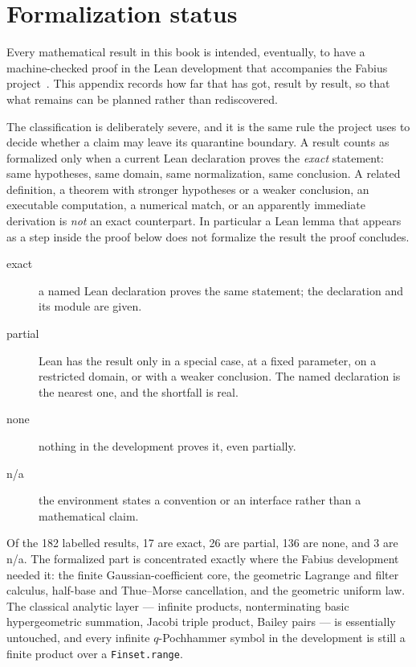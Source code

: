 \documentclass[11pt,oneside,openany]{book}
\theoremstyle{definition}
\theoremstyle{remark}
\newcommand{\statusexact}{\textsf{\color{statusgreen}exact}}
\newcommand{\statuspartial}{\textsf{\color{statusamber}partial}}
\newcommand{\statusnone}{\textsf{\color{statusred}none}}
\newcommand{\statusna}{\textsf{n/a}}
\begin{document}
\chapter{Formalization status}\label{app:lean-status}

Every mathematical result in this book is intended, eventually, to have a
machine-checked proof in the Lean development that accompanies the Fabius
project~\cite{ReshetnikovProveIt2026}.  This appendix records how far that
has got, result by result, so that what remains can be planned rather than
rediscovered.

The classification is deliberately severe, and it is the same rule the
project uses to decide whether a claim may leave its quarantine boundary.
A result counts as formalized only when a current Lean declaration proves
the \emph{exact} statement: same hypotheses, same domain, same
normalization, same conclusion.  A related definition, a theorem with
stronger hypotheses or a weaker conclusion, an executable computation, a
numerical match, or an apparently immediate derivation is \emph{not} an
exact counterpart.  In particular a Lean lemma that appears as a step
inside the proof below does not formalize the result the proof concludes.

\begin{description}
\item[\statusexact] a named Lean declaration proves the same statement; the
  declaration and its module are given.
\item[\statuspartial] Lean has the result only in a special case, at a fixed
  parameter, on a restricted domain, or with a weaker conclusion.  The named
  declaration is the nearest one, and the shortfall is real.
\item[\statusnone] nothing in the development proves it, even partially.
\item[\statusna] the environment states a convention or an interface rather
  than a mathematical claim.
\end{description}

Of the 182 labelled results, 17 are \statusexact, 26 are \statuspartial,
136 are \statusnone, and 3 are \statusna.
The formalized part is concentrated exactly where the Fabius development
needed it: the finite Gaussian-coefficient core, the geometric Lagrange and
filter calculus, half-base and Thue--Morse cancellation, and the geometric
uniform law.  The classical analytic layer --- infinite products,
nonterminating basic hypergeometric summation, Jacobi triple product,
Bailey pairs --- is essentially untouched, and every infinite
$q$-Pochhammer symbol in the development is still a finite product over a
\texttt{Finset.range}.
\end{document}
